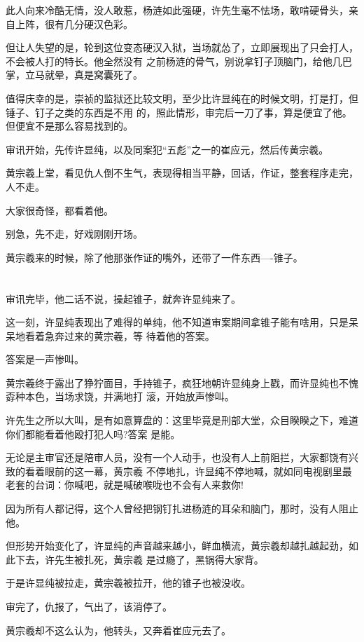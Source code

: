 \documentclass[11pt,a4paper,onecolumn]{article}
\begin{document}
此人向来冷酷无情，没人敢惹，杨涟如此强硬，许先生毫不怯场，敢啃硬骨头，亲自上阵，很有几分硬汉色彩。

但让人失望的是，轮到这位变态硬汉入狱，当场就怂了，立即展现出了只会打人，不会被人打的特长。他全然没有
之前杨涟的骨气，别说拿钉子顶脑门，给他几巴掌，立马就晕，真是窝囊死了。

值得庆幸的是，崇祯的监狱还比较文明，至少比许显纯在的时候文明，打是打，但锤子、钉子之类的东西是不用
的，照此情形，审完后一刀了事，算是便宜了他。但便宜不是那么容易找到的。

审讯开始，先传许显纯，以及同案犯``五彪''之一的崔应元，然后传黄宗羲。

黄宗羲上堂，看见仇人倒不生气，表现得相当平静，回话，作证，整套程序走完，人不走。

大家很奇怪，都看着他。

别急，先不走，好戏刚刚开场。

黄宗羲来的时候，除了他那张作证的嘴外，还带了一件东西----锥子。

\section[\thesection]{}

审讯完毕，他二话不说，操起锥子，就奔许显纯来了。

这一刻，许显纯表现出了难得的单纯，他不知道审案期间拿锥子能有啥用，只是呆呆地看着急奔过来的黄宗羲，等
待着他的答案。

答案是一声惨叫。

黄宗羲终于露出了狰狞面目，手持锥子，疯狂地朝许显纯身上戳，而许显纯也不愧孬种本色，当场求饶，并满地打
滚，开始放声惨叫。

许先生之所以大叫，是有如意算盘的：这里毕竟是刑部大堂，众目睽睽之下，难道你们都能看着他殴打犯人吗?答案
是能。

无论是主审官还是陪审人员，没有一个人动手，也没有人上前阻拦，大家都饶有兴致的看着眼前的这一幕，黄宗羲
不停地扎，许显纯不停地喊，就如同电视剧里最老套的台词：你喊吧，就是喊破喉咙也不会有人来救你!

因为所有人都记得，这个人曾经把钢钉扎进杨涟的耳朵和脑门，那时，没有人阻止他。

但形势开始变化了，许显纯的声音越来越小，鲜血横流，黄宗羲却越扎越起劲，如此下去，许先生被扎死，黄宗羲
是过瘾了，黑锅得大家背。

于是许显纯被拉走，黄宗羲被拉开，他的锥子也被没收。

审完了，仇报了，气出了，该消停了。

黄宗羲却不这么认为，他转头，又奔着崔应元去了。
\end{document}
